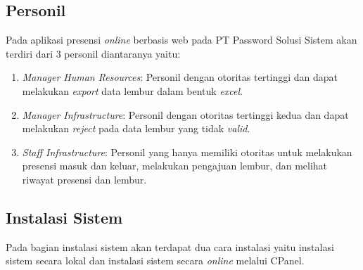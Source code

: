 \subsection{Personil}
Pada aplikasi presensi \textit{online} berbasis web pada PT Password Solusi Sistem akan terdiri dari 3 personil diantaranya yaitu:
\begin{enumerate}
    \item \textit{Manager Human Resources}: Personil dengan otoritas tertinggi dan dapat melakukan \textit{export} data lembur dalam bentuk \textit{excel}.

    \item \textit{Manager Infrastructure}: Personil dengan otoritas tertinggi kedua dan dapat melakukan \textit{reject} pada data lembur yang tidak \textit{valid}.

    \item \textit{Staff Infrastructure}: Personil yang hanya memiliki otoritas untuk melakukan presensi masuk dan keluar, melakukan pengajuan lembur, dan melihat riwayat presensi dan lembur.
\end{enumerate}

\subsection{Instalasi Sistem}\label{sec:instalation-system}
Pada bagian instalasi sistem akan terdapat dua cara instalasi yaitu instalasi sistem secara lokal dan instalasi sistem secara \textit{online} melalui CPanel.
